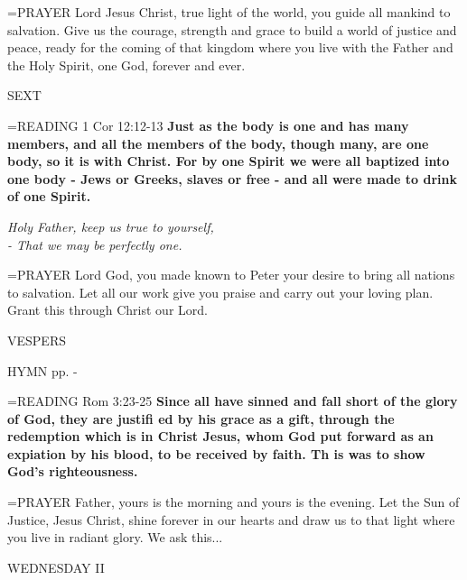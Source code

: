 \hangindent=\parindent \small{PRAYER  Lord Jesus Christ, true light of the world, you guide all mankind to salvation. Give us the courage, strength and grace to build a world of justice and peace, ready for the coming of that kingdom where you live with the Father and the Holy Spirit, one God, forever and ever.}

\begin{flushleft}\normalsize SEXT\\\end{flushleft}

\hangindent=\parindent \small{READING} 1 Cor 12:12-13 \textbf{Just as the body is one and has many members, and all the members of the body, though many, are one body, so it is with Christ. For by one Spirit we were all baptized into one body - Jews or Greeks, slaves or free - and all were made to drink of one Spirit. }

\begin{center}
\textit{Holy Father, keep us true to yourself,\\
- That we may be perfectly one.}
\end{center}

\hangindent=\parindent \small{PRAYER  Lord God, you made known to Peter your desire to bring all nations to salvation. Let all our work give you praise and carry out your loving plan. Grant this through Christ our Lord.}

\begin{flushleft}\normalsize VESPERS\\\end{flushleft}

HYMN pp. \pageref{ordinaryTime:fourthHymn} - \pageref{ordinaryTime:sixthHymn}

\hangindent=\parindent \small{READING} Rom 3:23-25 \textbf{Since all have sinned and fall short of the glory of God, they are justifi ed by his grace as a gift, through the redemption which is in Christ Jesus, whom God put forward as an expiation by his blood, to be received by faith. Th is was to show God’s righteousness.\\}

\hangindent=\parindent \small{PRAYER  Father, yours is the morning and yours is the evening. Let the Sun of Justice, Jesus Christ, shine forever in our hearts and draw us to that light where you live in radiant glory. We ask this...}

\begin{center}
\normalsize WEDNESDAY II
\end{center}

